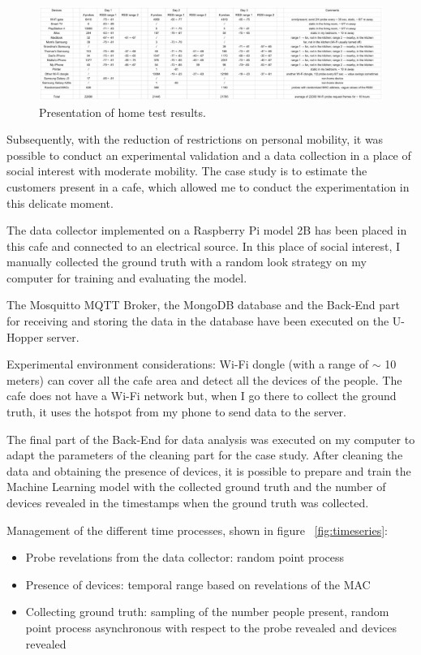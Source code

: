 \begin{figure}[h]
\centering 
\includegraphics[width=1.02\textwidth]{images/sniffertest} 
\caption{Presentation of home test results.}
\label{fig:sniffertest}
\end{figure}

Subsequently, with the reduction of restrictions on personal mobility, it was possible to conduct an experimental validation and a data collection in a place of social interest with moderate mobility. The case study is to estimate the customers present in a cafe, which allowed me to conduct the experimentation in this delicate moment.

The data collector implemented on a Raspberry Pi model 2B has been placed in this cafe and connected to an electrical source. In this place of social interest, I manually collected the ground truth with a random look strategy on my computer for training and evaluating the model.

The Mosquitto MQTT Broker, the MongoDB database and the Back-End part for receiving and storing the data in the database have been executed on the U-Hopper server.

Experimental environment considerations: Wi-Fi dongle (with a range of $\sim$ 10 meters) can cover all the cafe area and detect all the devices of the people. The cafe does not have a Wi-Fi network but, when I go there to collect the ground truth, it uses the hotspot from my phone to send data to the server.

The final part of the Back-End for data analysis was executed on my computer to adapt the parameters of the cleaning part for the case study. After cleaning the data and obtaining the presence of devices, it is possible to prepare and train the Machine Learning model with the collected ground truth and the number of devices revealed in the timestamps when the ground truth was collected.


Management of the different time processes, shown in figure ~\ref{fig:timeseries}:
\begin{itemize}
  \item Probe revelations from the data collector: random point process
  \item Presence of devices: temporal range based on revelations of the MAC
  \item Collecting ground truth: sampling of the number people present, random point process asynchronous with respect to the probe revealed and devices revealed
\end{itemize}

